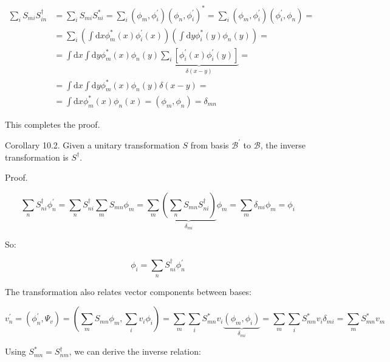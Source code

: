 \documentclass[italian]{HKNdocument}
\begin{document}
\begin{align*}
\sum_{i} S_{m i} S_{i n}^{\dagger} & =\sum_{i} S_{m i} S_{n i}^{*}=\sum_{i}\left(\phi_{m}, \phi_{i}^{\prime}\right)\left(\phi_{n}, \phi_{i}^{\prime}\right)^{*}=\sum_{i}\left(\phi_{m}, \phi_{i}^{\prime}\right)\left(\phi_{i}^{\prime}, \phi_{n}\right)= \\
& =\sum_{i}\left(\int \mathrm{d} x \phi_{m}^{*}(x) \phi_{i}^{\prime}(x)\right)\left(\int \mathrm{d} y \phi_{i}^{*}(y) \phi_{n}(y)\right)= \\
& =\int \mathrm{d} x \int \mathrm{d} y \phi_{m}^{*}(x) \phi_{n}(y) \underbrace{\sum_{i}\left[\phi_{i}^{\prime}(x) \phi_{i}^{\prime}(y)\right]}_{\delta(x-y)}= \\
& =\int \mathrm{d} x \int \mathrm{d} y \phi_{m}^{*}(x) \phi_{n}(y) \delta(x-y)= \\
& =\int \mathrm{d} x \phi_{m}^{*}(x) \phi_{n}(x)=\left(\phi_{m}, \phi_{n}\right)=\delta_{m n} \tag{10.14}
\end{align*}

This completes the proof.

Corollary 10.2. Given a unitary transformation $S$ from basis $\mathcal{B}^{\prime}$ to $\mathcal{B}$, the inverse transformation is $S^{\dagger}$.

Proof.

\begin{equation*}
\sum_{n} S_{n i}^{\dagger} \phi_{n}^{\prime}=\sum_{n} S_{n i}^{\dagger} \sum_{m} S_{m n} \phi_{m}=\sum_{m} \underbrace{\left(\sum_{n} S_{m n} S_{n i}^{\dagger}\right)}_{\delta_{m i}} \phi_{m}=\sum_{m} \delta_{m i} \phi_{m}=\phi_{i} \tag{10.15}
\end{equation*}


So:

\begin{equation*}
\phi_{i}=\sum_{n} S_{n i}^{\dagger} \phi_{n}^{\prime} \tag{10.16}
\end{equation*}

The transformation also relates vector components between bases:

\begin{equation*}
v_{n}^{\prime}=\left(\phi_{n}^{\prime}, \Psi_{v}\right)=\left(\sum_{m} S_{m n} \phi_{m}, \sum_{i} v_{i} \phi_{i}\right)=\sum_{m} \sum_{i} S_{m n}^{*} v_{i} \underbrace{\left(\phi_{m}, \phi_{i}\right)}_{\delta_{m i}}=\sum_{m} \sum_{i} S_{m n}^{*} v_{i} \delta_{m i}=\sum_{m} S_{m n}^{*} v_{m} \tag{10.17}
\end{equation*}

Using $S_{m n}^{*}=S_{n m}^{\dagger}$, we can derive the inverse relation:
\end{document}
